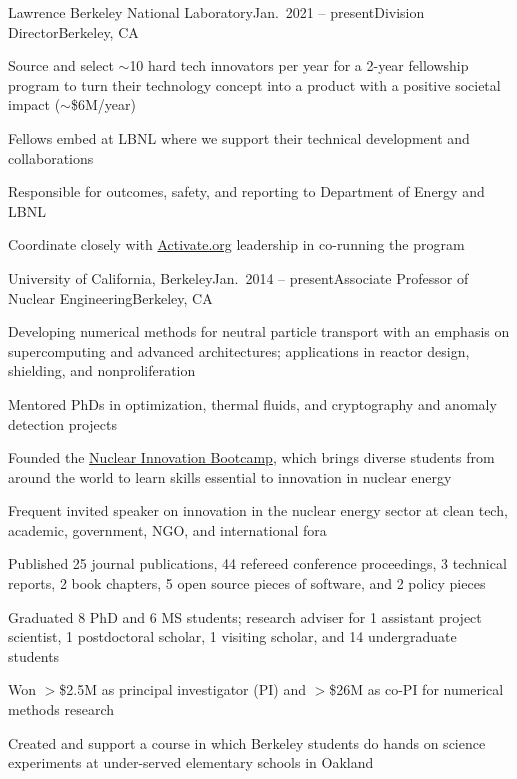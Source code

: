 \begin{rSubsection}{Lawrence Berkeley National Laboratory}{Jan.\ 2021 -- present}{Division Director}{Berkeley, CA}
\item Source and select $\sim$10 hard tech innovators per year for a 2-year fellowship program to turn their technology concept into a product with a positive societal impact ($\sim$\$6M/year) 
\item Fellows embed at LBNL where we support their technical development and collaborations
\item Responsible for outcomes, safety, and reporting to Department of Energy and LBNL
\item Coordinate closely with \href{https://www.activate.org/}{Activate.org} leadership in co-running the program
\end{rSubsection}

\begin{rSubsection}{University of California, Berkeley}{Jan.\ 2014 -- present}{Associate Professor of Nuclear Engineering}{Berkeley, CA}
\item Developing numerical methods for neutral particle transport with an emphasis on supercomputing and advanced architectures; applications in reactor design, shielding, and nonproliferation
\item Mentored PhDs in optimization, thermal fluids, and cryptography and anomaly detection projects
\item Founded the \href{https://www.nuclearinnovationbootcamp.org/}{Nuclear Innovation Bootcamp}, which brings diverse students from around the world to learn skills essential to innovation in nuclear energy 
\item Frequent invited speaker on innovation in the nuclear energy sector at clean tech, academic, government, NGO, and international fora
\item Published 25 journal publications, 44 refereed conference proceedings, 3 technical reports, 2 book chapters, 5 open source pieces of software, and 2 policy pieces
\item Graduated 8 PhD and 6 MS students; research adviser for 1 assistant project scientist, 1 postdoctoral scholar, 1 visiting scholar, and 14 undergraduate students
\item Won $>$\$2.5M as principal investigator (PI) and $>$\$26M as co-PI for numerical methods research
\item Created and support a course in which Berkeley students do hands on science experiments at under-served elementary schools in Oakland
\end{rSubsection}

